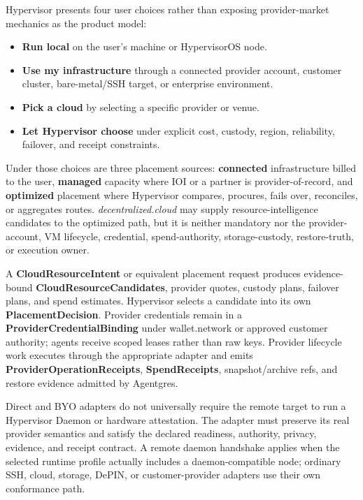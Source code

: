\documentclass[
  11pt,
]{article}
\providecommand{\tightlist}{%
  \setlength{\itemsep}{0pt}\setlength{\parskip}{0pt}}
\begin{document}
Hypervisor presents four user choices rather than exposing provider-market
mechanics as the product model:

\begin{itemize}
\tightlist
\item
  \textbf{Run local} on the user's machine or HypervisorOS node.
\item
  \textbf{Use my infrastructure} through a connected provider account,
  customer cluster, bare-metal/SSH target, or enterprise environment.
\item
  \textbf{Pick a cloud} by selecting a specific provider or venue.
\item
  \textbf{Let Hypervisor choose} under explicit cost, custody, region,
  reliability, failover, and receipt constraints.
\end{itemize}

Under those choices are three placement sources: \textbf{connected}
infrastructure billed to the user, \textbf{managed} capacity where IOI or
a partner is provider-of-record, and \textbf{optimized} placement where
Hypervisor compares, procures, fails over, reconciles, or aggregates routes.
\emph{decentralized.cloud} may supply resource-intelligence candidates to the
optimized path, but it is neither mandatory nor the provider-account, VM
lifecycle, credential, spend-authority, storage-custody, restore-truth, or
execution owner.

A \textbf{CloudResourceIntent} or equivalent placement request produces
evidence-bound \textbf{CloudResourceCandidates}, provider quotes, custody
plans, failover plans, and spend estimates. Hypervisor selects a candidate
into its own \textbf{PlacementDecision}. Provider credentials remain in a
\textbf{ProviderCredentialBinding} under wallet.network or approved
customer authority; agents receive scoped leases rather than raw keys.
Provider lifecycle work executes through the appropriate adapter and emits
\textbf{ProviderOperationReceipts}, \textbf{SpendReceipts}, snapshot/archive
refs, and restore evidence admitted by Agentgres.

Direct and BYO adapters do not universally require the remote target to run
a Hypervisor Daemon or hardware attestation. The adapter must preserve its
real provider semantics and satisfy the declared readiness, authority,
privacy, evidence, and receipt contract. A remote daemon handshake applies
when the selected runtime profile actually includes a daemon-compatible node;
ordinary SSH, cloud, storage, DePIN, or customer-provider adapters use their
own conformance path.
\end{document}
